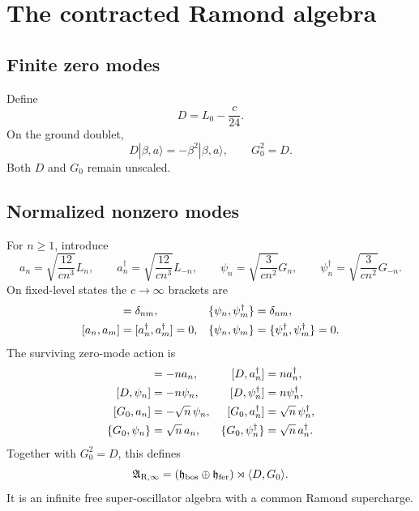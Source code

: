 \documentclass[11pt]{article}
\newcommand{\R}{\mathrm R}
\newcommand{\Ainf}{\mathfrak A_{\R,\infty}}
\begin{document}
\section{The contracted Ramond algebra}

\subsection{Finite zero modes}

Define
\begin{equation}
 D=L_0-\frac{c}{24}.
 \label{eq:D}
\end{equation}
On the ground doublet,
\begin{equation}
 D|\beta,a\rangle=-\beta^2|\beta,a\rangle,
 \qquad
 G_0^2=D.
 \label{eq:ground}
\end{equation}
Both \(D\) and \(G_0\) remain unscaled.

\subsection{Normalized nonzero modes}

For \(n\ge1\), introduce
\begin{equation}
 a_n=\sqrt{\frac{12}{cn^3}}L_n,
 \qquad
 a_n^\dagger=\sqrt{\frac{12}{cn^3}}L_{-n},
 \qquad
 \psi_n=\sqrt{\frac{3}{cn^2}}G_n,
 \qquad
 \psi_n^\dagger=\sqrt{\frac{3}{cn^2}}G_{-n}.
 \label{eq:normalized-modes}
\end{equation}
On fixed-level states the \(c\to\infty\) brackets are
\begin{align}
 [a_n,a_m^\dagger]&=\delta_{nm},
 &
 \{\psi_n,\psi_m^\dagger\}&=\delta_{nm},
 \notag\\
 [a_n,a_m]&=[a_n^\dagger,a_m^\dagger]=0,
 &
 \{\psi_n,\psi_m\}
 &=\{\psi_n^\dagger,\psi_m^\dagger\}=0.
 \label{eq:free-oscillators}
\end{align}
The surviving zero-mode action is
\begin{align}
 [D,a_n]&=-na_n,
 &
 [D,a_n^\dagger]&=na_n^\dagger,
 \notag\\
 [D,\psi_n]&=-n\psi_n,
 &
 [D,\psi_n^\dagger]&=n\psi_n^\dagger,
 \notag\\
 [G_0,a_n]&=-\sqrt n\,\psi_n,
 &
 [G_0,a_n^\dagger]&=\sqrt n\,\psi_n^\dagger,
 \notag\\
 \{G_0,\psi_n\}&=\sqrt n\,a_n,
 &
 \{G_0,\psi_n^\dagger\}&=\sqrt n\,a_n^\dagger.
 \label{eq:zero-mode-action}
\end{align}
Together with \(G_0^2=D\), this defines
\begin{equation}
 \Ainf=
 \left(\mathfrak h_{\rm bos}\oplus\mathfrak h_{\rm fer}\right)
 \rtimes\langle D,G_0\rangle.
 \label{eq:contracted-algebra}
\end{equation}
It is an infinite free super-oscillator algebra with a common Ramond
supercharge.
\end{document}
